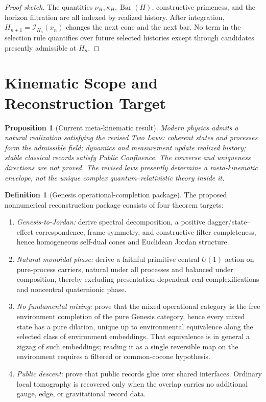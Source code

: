 \documentclass[11pt]{article}
\theoremstyle{plain}
\newtheorem{proposition}[theorem]{Proposition}
\theoremstyle{definition}
\newtheorem{definition}[theorem]{Definition}
\theoremstyle{remark}
\newenvironment{proofsketch}{\begin{proof}[Proof sketch]}{\end{proof}}
\newcommand{\I}{\mathcal{I}}
\newcommand{\SelBar}{\operatorname{Bar}}
\begin{document}
\begin{proofsketch}
The quantities \(\nu_H,\kappa_H,\SelBar(H)\), constructive primeness, and the horizon filtration are all indexed by realized history. After integration, \(H_{n+1}=\I_{H_n}(x_n)\) changes the next cone and the next bar. No term in the selection rule quantifies over future selected histories except through candidates presently admissible at \(H_n\).
\end{proofsketch}

\section{Kinematic Scope and Reconstruction Target}

\begin{proposition}[Current meta-kinematic result]
Modern physics admits a natural realization satisfying the revised Two Laws: coherent states and processes form the admissible field; dynamics and measurement update realized history; stable classical records satisfy Public Confluence. The converse and uniqueness directions are not proved. The revised laws presently determine a meta-kinematic envelope, not the unique complex quantum--relativistic theory inside it.
\end{proposition}

\begin{definition}[Genesis operational-completion package]
The proposed nonnumerical reconstruction package consists of four theorem targets:
\begin{enumerate}[leftmargin=*]
\item \emph{Genesis-to-Jordan:} derive spectral decomposition, a positive dagger/state--effect correspondence, frame symmetry, and constructive filter completeness, hence homogeneous self-dual cones and Euclidean Jordan structure.
\item \emph{Natural monoidal phase:} derive a faithful primitive central \(U(1)\) action on pure-process carriers, natural under all processes and balanced under composition, thereby excluding presentation-dependent real complexifications and noncentral quaternionic phase.
\item \emph{No fundamental mixing:} prove that the mixed operational category is the free environment completion of the pure Genesis category, hence every mixed state has a pure dilation, unique up to environmental equivalence along the selected class of environment embeddings. That equivalence is in general a zigzag of such embeddings; reading it as a single reversible map on the environment requires a filtered or common-cocone hypothesis.
\item \emph{Public descent:} prove that public records glue over shared interfaces. Ordinary local tomography is recovered only when the overlap carries no additional gauge, edge, or gravitational record data.
\end{enumerate}
\end{definition}
\end{document}
